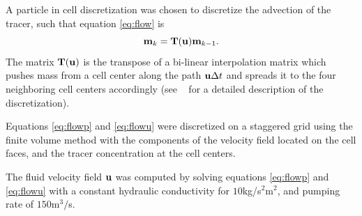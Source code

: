 \documentclass[11pt]{article}
\newcommand{\bfT}	{{\bf{T}}}
\newcommand{\bfm}	{{\bf{m}}}
\newcommand{\bfu}	{{\bf{u}}}
\begin{document}
A particle in cell discretization \cite{Edwards2012} was chosen to discretize the advection of the tracer, such that equation \eqref{eq:flow} is
\begin{equation*}
\bfm _k= \bfT(\bfu)\bfm_{k-1}. 
\end{equation*}
The matrix $\bfT(\bfu)$ is the transpose of a bi-linear interpolation matrix which pushes mass from a cell center along the  path $\bfu \Delta t$ and spreads it to the four neighboring cell centers accordingly (see ~\cite{Fohring2014} for
a detailed description of the discretization). 

Equations \eqref{eq:flowp} and \eqref{eq:flowu}  were discretized on a staggered grid using the finite volume method with the components of the velocity field located on the cell faces, and the tracer concentration at the cell centers. 

%
%       
%      
%      
%

The  fluid velocity field $\bfu$ was  computed by solving equations \eqref{eq:flowp} and \eqref{eq:flowu} with a constant hydraulic conductivity for  $10$kg/s$^2$m$^2$, and pumping rate of $150$m$^3/$s. 
\end{document}

